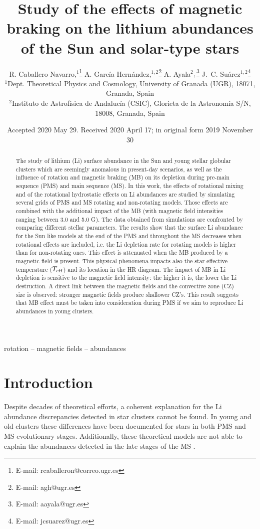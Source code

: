 \documentclass[fleqn,usenatbib]{mnras}
\title[Rotation, magnetic braking \& Li abundances]{Study of the effects of magnetic braking on the lithium abundances of the Sun and solar-type stars}
\author[R. Caballero Navarro et al.]{
R. Caballero Navarro,$^{1}$\thanks{E-mail: rcaballeron@correo.ugr.es}
A. Garc\'ia Hern\'andez,$^{1,2}$\thanks{E-mail: agh@ugr.es}
A. Ayala$^{2},$\thanks{E-mail: aayala@ugr.es}
J.~C. Su\'arez$^{1,2}$\thanks{E-mail: jcsuarez@ugr.es}
\\
$^{1}$Dept. Theoretical Physics and Cosmology, University of Granada (UGR), 18071, Granada, Spain\\
$^{2}$Instituto de Astrof\'isica de Andaluc\'ia (CSIC), Glorieta de la Astronom\'ia S/N, 18008, Granada, Spain\\
}
\date{Accepted 2020 May 29. Received 2020 April 17; in original form 2019 November 30}
\begin{document}
\label{firstpage}
\pagerange{\pageref{firstpage}--\pageref{lastpage}}
\maketitle

\begin{abstract}
The study of lithium (Li) surface abundance in the Sun and young stellar globular clusters which are seemingly anomalous in present-day scenarios, as well as the influence of rotation and magnetic braking (MB) on its depletion during pre-main sequence (PMS) and main sequence (MS).
In this work, the effects of rotational mixing and of the rotational hydrostatic effects on Li abundances are studied by simulating several grids of PMS and MS rotating and non-rotating models. Those effects are combined with the additional impact of the MB (with magnetic field intensities ranging between 3.0 and 5.0 G). The data obtained from simulations are confronted by comparing different stellar parameters. The results show that the surface Li abundance for the Sun like models at the end of the PMS and throughout the MS decreases when rotational effects are included, i.e. the Li depletion rate for rotating models is higher than for non-rotating ones. This effect is attenuated when the MB produced by a magnetic field is present. This physical phenomena impacts also the star effective temperature ($T_{\mathrm{eff}}$) and its location in the HR diagram. The impact of MB in Li depletion is sensitive to the magnetic field intensity: the higher it is, the lower the Li destruction. A direct link between the magnetic fields and the convective zone (CZ) size is observed: stronger magnetic fields produce shallower CZ's. This result suggests that MB effect must be taken into consideration during PMS if we aim to reproduce Li abundances in young clusters.
\end{abstract}

\begin{keywords}
rotation -- magnetic fields -- abundances
\end{keywords}



\section{Introduction} \label{sec_intro}
Despite decades of theoretical efforts, a coherent explanation for the Li abundance discrepancies detected in star clusters cannot be found. In young and old clusters these differences have been documented for stars in both PMS and MS  evolutionary stages. Additionally, these theoretical models are not able to explain the abundances detected in the late stages of the MS \citep{Tschape2001}.\par
\end{document}
